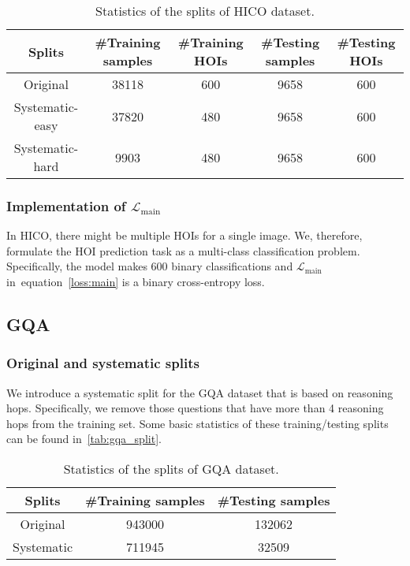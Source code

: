 \documentclass{article} \usepackage{iclr2022_conference,times}
\def\eqref#1{equation~\ref{#1}}
\newcommand{\loss}{\mathcal{L}}
\begin{document}
\begin{table}[h]
    \centering
    \begin{tabular}{ccccc}
    \toprule
    Splits & \#Training samples & \#Training HOIs & \#Testing samples & \#Testing HOIs   \\
    \midrule
    Original & 38118 &600 & 9658 &600 \\
    Systematic-easy &37820& 480 &9658 &600 \\
    Systematic-hard &9903& 480&9658 &600 \\
    \bottomrule
    \end{tabular}
    \caption{Statistics of the splits of HICO dataset.}
    \label{tab:hico_split}
\end{table}

\subsubsection{Implementation of $\loss_{\operatorname{main}}$}

In HICO, there might be multiple HOIs for a single image. We, therefore, formulate the HOI prediction task as a multi-class classification problem. Specifically, the model makes 600 binary classifications and $\loss_{\operatorname{main}}$ in~\eqref{loss:main} is a binary cross-entropy loss.

\subsection{GQA}

\subsubsection{Original and systematic splits}

We introduce a systematic split for the GQA dataset that is based on reasoning hops. Specifically, we remove those questions that have more than 4 reasoning hops from the training set. Some basic statistics of these training/testing splits can be found in~\autoref{tab:gqa_split}.

\begin{table}[h]
    \centering
    \begin{tabular}{ccc}
    \toprule
    Splits & \#Training samples & \#Testing samples  \\
    \midrule
    Original &943000 &132062 \\
    Systematic &711945 &32509 \\
    \bottomrule
    \end{tabular}
    \caption{Statistics of the splits of GQA dataset.}
    \label{tab:gqa_split}
\end{table}
\end{document}

